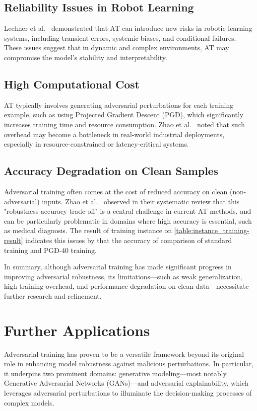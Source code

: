 \documentclass[10pt,twocolumn,letterpaper]{article}
\begin{document}
\subsection{Reliability Issues in Robot Learning}
Lechner et al.~\cite{lechner2021adversarialtrainingreadyrobot} demonstrated that AT can introduce new risks in robotic learning systems, including transient errors, systemic biases, and conditional failures. These issues suggest that in dynamic and complex environments, AT may compromise the model's stability and interpretability.

\subsection{High Computational Cost}
AT typically involves generating adversarial perturbations for each training example, such as using Projected Gradient Descent (PGD), which significantly increases training time and resource consumption. Zhao et al.~\cite{zhao2022review} noted that such overhead may become a bottleneck in real-world industrial deployments, especially in resource-constrained or latency-critical systems.

\subsection{Accuracy Degradation on Clean Samples}
Adversarial training often comes at the cost of reduced accuracy on clean (non-adversarial) inputs. Zhao et al.~\cite{a15080283} observed in their systematic review that this "robustness-accuracy trade-off" is a central challenge in current AT methods, and can be particularly problematic in domains where high accuracy is essential, such as medical diagnosis. The result of training instance on \cref{table:instance_training-result} indicates this issues by that the accuracy of comparison of standard training and PGD-40 training. 

In summary, although adversarial training has made significant progress in improving adversarial robustness, its limitations—such as weak generalization, high training overhead, and performance degradation on clean data—necessitate further research and refinement.

\section{Further Applications}

Adversarial training has proven to be a versatile framework beyond its original role in enhancing model robustness against malicious perturbations. In particular, it underpins two prominent domains: generative modeling—most notably Generative Adversarial Networks (GANs)—and adversarial explainability, which leverages adversarial perturbations to illuminate the decision-making processes of complex models.
\end{document}
